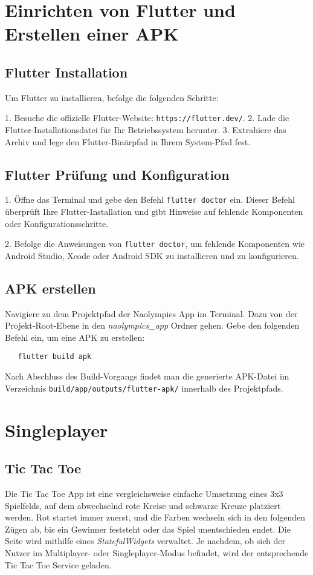 \section{Einrichten von Flutter und Erstellen einer APK}
\subsection{Flutter Installation}

Um Flutter zu installieren, befolge die folgenden Schritte:

1. Besuche die offizielle Flutter-Website: \texttt{https://flutter.dev/}.
2. Lade die Flutter-Installationsdatei für Ihr Betriebssystem herunter.
3. Extrahiere das Archiv und lege den Flutter-Binärpfad in Ihrem System-Pfad fest.

\subsection{Flutter Prüfung und Konfiguration}
1. Öffne das Terminal und gebe den Befehl \texttt{flutter doctor} ein. Dieser Befehl überprüft Ihre Flutter-Installation und gibt Hinweise auf fehlende Komponenten oder Konfigurationsschritte.

2. Befolge die Anweisungen von \texttt{flutter doctor}, um fehlende Komponenten wie Android Studio, Xcode oder Android SDK zu installieren und zu konfigurieren.

\subsection{APK erstellen}
Navigiere zu dem Projektpfad der Naolympics App im Terminal. Dazu von der Projekt-Root-Ebene in den \textit{naolympics\_app} Ordner gehen.
\newline
Gebe den folgenden Befehl ein, um eine APK zu erstellen:
   \begin{verbatim}
   flutter build apk
   \end{verbatim}
Nach Abschluss des Build-Vorgangs findet man die generierte APK-Datei im Verzeichnis \texttt{build/app/outputs/flutter-apk/} innerhalb des Projektpfads.

\section{Singleplayer}

\subsection{Tic Tac Toe}
Die Tic Tac Toe App ist eine vergleichsweise einfache Umsetzung eines 3x3 Spielfelds, auf dem abwechselnd rote Kreise und schwarze Kreuze platziert werden. Rot startet immer zuerst, und die Farben wechseln sich in den folgenden Zügen ab, bis ein Gewinner feststeht oder das Spiel unentschieden endet.
\newline
Die Seite wird mithilfe eines \textit{StatefulWidgets} verwaltet. Je nachdem, ob sich der Nutzer im Multiplayer- oder Singleplayer-Modus befindet, wird der entsprechende Tic Tac Toe Service geladen.

